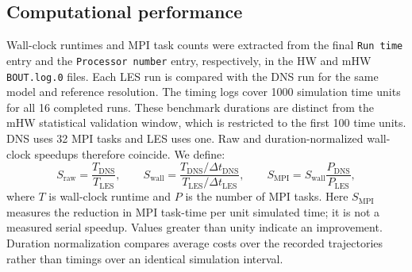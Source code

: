 \documentclass[authoryear,preprint,review,12pt]{elsarticle}
\begin{document}
\subsection{Computational performance}

Wall-clock runtimes and MPI task counts were extracted from the final \texttt{Run time} entry and the \texttt{Processor number} entry, respectively, in the HW and mHW \texttt{BOUT.log.0} files. Each LES run is compared with the DNS run for the same model and reference resolution. The timing logs cover 1000 simulation time units for all 16 completed runs. These benchmark durations are distinct from the mHW statistical validation window, which is restricted to the first 100 time units. DNS uses 32 MPI tasks and LES uses one. Raw and duration-normalized wall-clock speedups therefore coincide. We define:
\begin{equation}
    S_{\mathrm{raw}}=\frac{T_{\mathrm{DNS}}}{T_{\mathrm{LES}}},
    \qquad
    S_{\mathrm{wall}}=
    \frac{T_{\mathrm{DNS}}/\Delta t_{\mathrm{DNS}}}
         {T_{\mathrm{LES}}/\Delta t_{\mathrm{LES}}},
    \qquad
    S_{\mathrm{MPI}}=S_{\mathrm{wall}}
    \frac{P_{\mathrm{DNS}}}{P_{\mathrm{LES}}},
\end{equation}
where $T$ is wall-clock runtime and $P$ is the number of MPI tasks. Here $S_{\mathrm{MPI}}$ measures the reduction in MPI task-time per unit simulated time; it is not a measured serial speedup. Values greater than unity indicate an improvement. Duration normalization compares average costs over the recorded trajectories rather than timings over an identical simulation interval.
\end{document}
